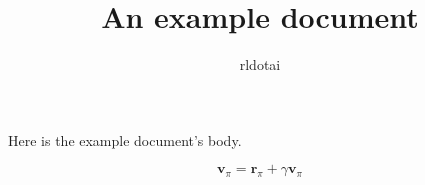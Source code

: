 

\title{An example document}
\author{rldotai}



\maketitle
\tableofcontents

Here is the example document's body.

$$\mathbf{v}_{\pi} = \mathbf{r}_{\pi} + \gamma \mathbf{v}_{\pi}$$
 
